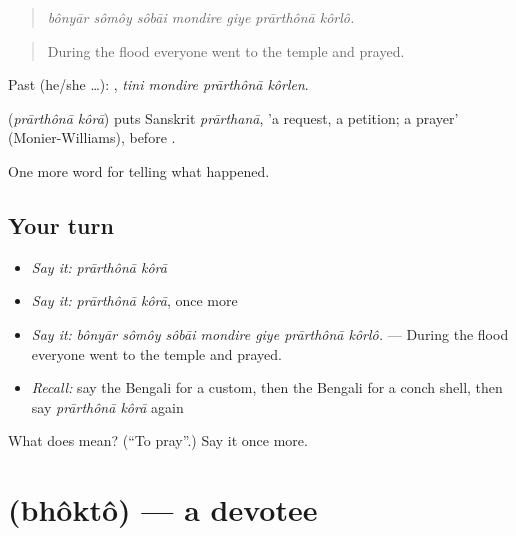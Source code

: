 \begin{quote}
\emph{bônyār sômôy sôbāi mondire giye prārthônā kôrlô.}
\end{quote}

\begin{quote}
During the flood everyone went to the temple and prayed.
\end{quote}

Past (he/she …):    , \emph{tini mondire prārthônā kôrlen}.

\begin{cousinweb}
\textbf{ } (\emph{prārthônā kôrā}) puts Sanskrit \emph{prārthanā}, 'a request, a petition; a prayer' (Monier-Williams), before .
\end{cousinweb}

\begin{grammarlens}[title={What you've built}]
One more word for telling what happened.
\end{grammarlens}

\subsection*{Your turn}
\begin{itemize}
\raggedright
  \item \emph{Say it:} \emph{prārthônā kôrā}
  \item \emph{Say it:} \emph{prārthônā kôrā}, once more
  \item \emph{Say it:} \emph{bônyār sômôy sôbāi mondire giye prārthônā kôrlô.} — During the flood everyone went to the temple and prayed.
  \item \emph{Recall:} say the Bengali for a custom, then the Bengali for a conch shell, then say \emph{prārthônā kôrā} again
\end{itemize}

\begin{tcolorbox}[breakable,colback=teal!4,colframe=teal!35!black,title={Before you move on}]
What does   mean? (\textquotedblleft{}To pray\textquotedblright{}.) Say it once more.
\end{tcolorbox}
\section[\texorpdfstring{\bn{ভক্ত} (bhôktô)}{ভক্ত (bhôktô)}]{ (bhôktô) — a devotee}

\label{lesson:BN-C310-bhokto}



